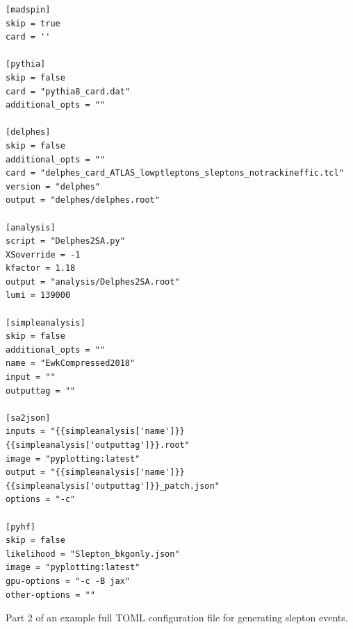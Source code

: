 \documentclass{article}
\begin{document}
\begin{listing}[H]
	\begin{verbatim}
[madspin]
skip = true
card = ''

[pythia]
skip = false
card = "pythia8_card.dat"
additional_opts = ""

[delphes]
skip = false
additional_opts = ""
card = "delphes_card_ATLAS_lowptleptons_sleptons_notrackineffic.tcl"
version = "delphes"
output = "delphes/delphes.root"

[analysis]
script = "Delphes2SA.py"
XSoverride = -1
kfactor = 1.18
output = "analysis/Delphes2SA.root"
lumi = 139000

[simpleanalysis]
skip = false
additional_opts = ""
name = "EwkCompressed2018"
input = ""
outputtag = ""

[sa2json]
inputs = "{{simpleanalysis['name']}}{{simpleanalysis['outputtag']}}.root"
image = "pyplotting:latest"
output = "{{simpleanalysis['name']}}{{simpleanalysis['outputtag']}}_patch.json"
options = "-c"

[pyhf]
skip = false
likelihood = "Slepton_bkgonly.json"
image = "pyplotting:latest"
gpu-options = "-c -B jax"
other-options = ""
  \end{verbatim}
	\caption{Part 2 of an example full TOML configuration file for generating slepton events.}
	\label{slepton-config-2}
\end{listing}
\end{document}
